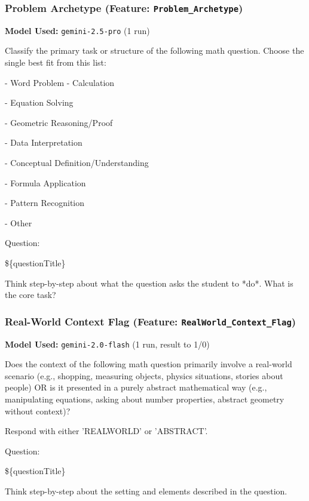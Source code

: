 \documentclass[
    a4paper, %
    10pt, %
    twoside, %
]{LTJournalArticle}
\begin{document}
\subsubsection{Problem Archetype (Feature: \texttt{Problem\_Archetype})}
\label{app:prompt_problem_archetype}
\textbf{Model Used:} \texttt{gemini-2.5-pro} (1 run)
\begin{promptbox}
Classify the primary task or structure of the following math question. Choose the single best fit from this list:

\vspace{1em}

- Word Problem - Calculation

- Equation Solving

- Geometric Reasoning/Proof

- Data Interpretation

- Conceptual Definition/Understanding

- Formula Application

- Pattern Recognition

- Other

\vspace{1em}

Question:

\$\{questionTitle\}

\vspace{1em}

Think step-by-step about what the question asks the student to *do*. What is the core task?
\end{promptbox}

\subsubsection{Real-World Context Flag (Feature: \texttt{RealWorld\_Context\_Flag})}
\label{app:prompt_realworld_flag}
\textbf{Model Used:} \texttt{gemini-2.0-flash} (1 run, result to 1/0)
\begin{promptbox}
Does the context of the following math question primarily involve a real-world scenario (e.g., shopping, measuring objects, physics situations, stories about people) OR is it presented in a purely abstract mathematical way (e.g., manipulating equations, asking about number properties, abstract geometry without context)?

\vspace{1em}

Respond with either 'REALWORLD' or 'ABSTRACT'.

\vspace{1em}

Question:

\$\{questionTitle\}

\vspace{1em}

Think step-by-step about the setting and elements described in the question.
\end{promptbox}
\end{document}
